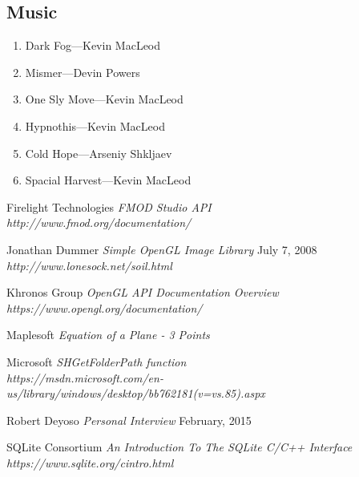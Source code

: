 \documentclass{article}
\begin{document}
\subsection{Music}

\begin{enumerate}
	\item Dark Fog---Kevin MacLeod
	\item Mismer---Devin Powers
	\item One Sly Move---Kevin MacLeod
	\item Hypnothis---Kevin MacLeod
	\item Cold Hope---Arseniy Shkljaev
	\item Spacial Harvest---Kevin MacLeod
\end{enumerate}

\pagebreak
\begin{thebibliography}{9}

Firelight Technologies 
\textit{FMOD Studio API} \\
\textit{http://www.fmod.org/documentation/}

Jonathan Dummer
\textit{Simple OpenGL Image Library} July 7, 2008 \\
\textit{http://www.lonesock.net/soil.html}
	
Khronos Group
\textit{OpenGL API Documentation Overview} \\
\textit{https://www.opengl.org/documentation/}

Maplesoft
\textit{Equation of a Plane - 3 Points}

Microsoft
\textit{SHGetFolderPath function} \\
\textit{https://msdn.microsoft.com/en-us/library/windows/desktop/bb762181(v=vs.85).aspx}

Robert Deyoso
\textit{Personal Interview} February, 2015

SQLite Consortium
\textit{An Introduction To The SQLite C/C++ Interface} \\
\textit{https://www.sqlite.org/cintro.html}

\end{thebibliography}
\end{document}
